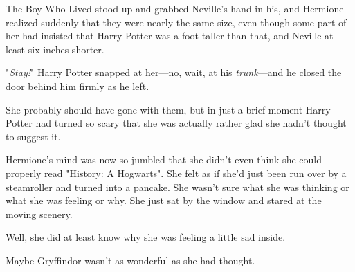 The Boy-Who-Lived stood up and grabbed Neville's hand in his, and Hermione
realized suddenly that they were nearly the same size, even
though some part of her had insisted that Harry Potter was a foot taller than
that, and Neville at least six inches shorter.

"\emph{Stay!}" Harry Potter snapped at her—no, wait, at his
\emph{trunk}—and he closed the door behind him firmly as he left.

She probably should have gone with them, but in just a brief moment Harry
Potter had turned so scary that she was actually rather glad she hadn't thought
to suggest it.

Hermione's mind was now so jumbled that she didn't even think she could
properly read "History: A Hogwarts". She felt as if she'd just been run over by
a steamroller and turned into a pancake. She wasn't sure what she was thinking
or what she was feeling or why. She just sat by the window and stared at the
moving scenery.

Well, she did at least know why she was feeling a little sad inside.

Maybe Gryffindor wasn't as wonderful as she had thought.
